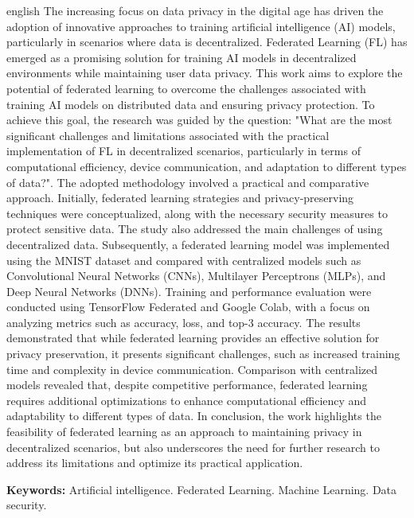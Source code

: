 \begin{resumo}[Abstract]
 \begin{otherlanguage*}{english}
  The increasing focus on data privacy in the digital age has driven the adoption of innovative approaches to training artificial intelligence (AI) models, particularly in scenarios where data is decentralized. Federated Learning (FL) has emerged as a promising solution for training AI models in decentralized environments while maintaining user data privacy. This work aims to explore the potential of federated learning to overcome the challenges associated with training AI models on distributed data and ensuring privacy protection. To achieve this goal, the research was guided by the question: "What are the most significant challenges and limitations associated with the practical implementation of FL in decentralized scenarios, particularly in terms of computational efficiency, device communication, and adaptation to different types of data?". The adopted methodology involved a practical and comparative approach. Initially, federated learning strategies and privacy-preserving techniques were conceptualized, along with the necessary security measures to protect sensitive data. The study also addressed the main challenges of using decentralized data. Subsequently, a federated learning model was implemented using the MNIST dataset and compared with centralized models such as Convolutional Neural Networks (CNNs), Multilayer Perceptrons (MLPs), and Deep Neural Networks (DNNs). Training and performance evaluation were conducted using TensorFlow Federated and Google Colab, with a focus on analyzing metrics such as accuracy, loss, and top-3 accuracy. The results demonstrated that while federated learning provides an effective solution for privacy preservation, it presents significant challenges, such as increased training time and complexity in device communication. Comparison with centralized models revealed that, despite competitive performance, federated learning requires additional optimizations to enhance computational efficiency and adaptability to different types of data. In conclusion, the work highlights the feasibility of federated learning as an approach to maintaining privacy in decentralized scenarios, but also underscores the need for further research to address its limitations and optimize its practical application.


    \vspace{\onelineskip}
 
    \noindent 
    \textbf{Keywords:} Artificial intelligence. Federated Learning. Machine Learning. Data security.
 \end{otherlanguage*}
\end{resumo}
